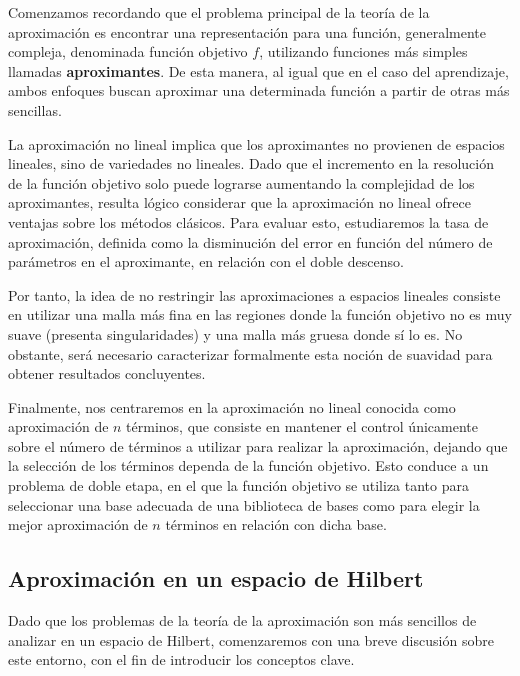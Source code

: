 Comenzamos recordando que el problema principal de la teoría de la aproximación es encontrar una representación para una función, generalmente compleja, denominada función objetivo $f$, utilizando funciones más simples llamadas \textbf{aproximantes}. De esta manera, al igual que en el caso del aprendizaje, ambos enfoques buscan aproximar una determinada función a partir de otras más sencillas.\newline

La aproximación no lineal implica que los aproximantes no provienen de espacios lineales, sino de variedades no lineales. Dado que el incremento en la resolución de la función objetivo solo puede lograrse aumentando la complejidad de los aproximantes, resulta lógico considerar que la aproximación no lineal ofrece ventajas sobre los métodos clásicos. Para evaluar esto, estudiaremos la tasa de aproximación, definida como la disminución del error en función del número de parámetros en el aproximante, en relación con el doble descenso.\newline

Por tanto, la idea de no restringir las aproximaciones a espacios lineales consiste en utilizar una malla más fina en las regiones donde la función objetivo no es muy suave (presenta singularidades) y una malla más gruesa donde sí lo es. No obstante, será necesario caracterizar formalmente esta noción de suavidad para obtener resultados concluyentes.\newline

Finalmente, nos centraremos en la aproximación no lineal conocida como aproximación de $n$ términos, que consiste en mantener el control únicamente sobre el número de términos a utilizar para realizar la aproximación, dejando que la selección de los términos dependa de la función objetivo. Esto conduce a un problema de doble etapa, en el que la función objetivo se utiliza tanto para seleccionar una base adecuada de una biblioteca de bases como para elegir la mejor aproximación de $n$ términos en relación con dicha base.

\subsection{Aproximación en un espacio de Hilbert}

Dado que los problemas de la teoría de la aproximación son más sencillos de analizar en un espacio de Hilbert, comenzaremos con una breve discusión sobre este entorno, con el fin de introducir los conceptos clave.\newline

